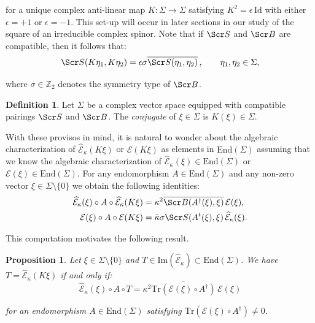 \documentclass[10pt,a4paper,twoside,reqno]{amsart}
\theoremstyle{plain}
\newtheorem{prop}[thm]{Proposition}
\theoremstyle{definition}
\newtheorem{definition}[thm]{Definition}
\theoremstyle{remark}
\newcommand{\End}{\mathrm{End}}
\def\Id{\mathrm{Id}}
\newcommand{\Tr}{\mathrm{Tr}}
\def\scB{\Scr B}
\def\scS{\Scr S}
\def\cE{\mathcal{E}}
\def\hcE{\widehat{\mathcal{E}}}
\def\Im{\mathrm{Im}}
\begin{document}
\noindent
for a unique complex anti-linear map $K\colon \Sigma \to \Sigma$ satisfying $K^2 = \epsilon\, \Id$ with either $\epsilon = +1$ or $\epsilon = -1$. This set-up will occur in later sections in our study of the square of an irreducible complex spinor. Note that if $\scS$ and $\scB$ are compatible, then it follows that:
\begin{equation*}
\scS(K\eta_1 , K\eta_2) = \epsilon \sigma  \overline{\scS(\eta_1 , \eta_2)}\, ,\qquad  \eta_1 , \eta_2 \in \Sigma,
\end{equation*}

\noindent
where $\sigma\in \mathbb{Z}_2$ denotes the symmetry type of $\scB$. 
\begin{definition}
\label{def:conjugatevector}
Let $\Sigma$ be a complex vector space equipped with compatible pairings $\scS$ and $\scB$. The \emph{conjugate} of $\xi \in \Sigma$ is $K(\xi) \in \Sigma$. 
\end{definition}

\noindent
With these provisos in mind, it is natural to wonder about the algebraic characterization of $\hcE_{\kappa}(K\xi)$ or $\cE(K\xi)$ as elements in $\End(\Sigma)$ assuming that we know the algebraic characterization of $\hcE_{\kappa}(\xi) \in \End(\Sigma)$ or $\cE(\xi) \in \End(\Sigma)$. For any endomorphism $A\in \End(\Sigma)$ and any non-zero vector $\xi\in \Sigma \setminus \{ 0 \}$ we obtain the following identities:
\begin{align}
\hcE_{\kappa}(\xi) \circ A\circ \hcE_{\kappa}(K\xi) &=   \kappa^2 \overline{\scB(A^{\dagger}(\xi),\xi)}\, \cE(\xi), \label{eq:conjugatemix1}\\
\cE(\xi) \circ A\circ \cE(K\xi) &= \bar{\kappa} \sigma  \scS( A^t(\xi) , \xi) \, \hcE_\kappa(\xi). \label{eq:conjugatemix2}
\end{align}

\noindent
This computation motivates the following result. 

\begin{prop}
\label{prop:conjugatevectorsquaresesqui}
Let $\xi \in \Sigma\setminus \{ 0\}$ and $T\in \Im(\hcE_{\kappa})\subset \End(\Sigma)$. We have $T = \hcE_{\kappa}(K \xi)$ if and only if:
\begin{equation}
\label{eq:conjugatevectorsquaresesqui}
\hcE_{\kappa}(\xi) \circ A\circ T = \kappa^2 \overline{\Tr(\cE(\xi) \circ A^{\dagger})}\, \cE(\xi)
\end{equation}

\noindent
for an endomorphism $A\in \End(\Sigma)$ satisfying $\Tr(\cE(\xi) \circ A^{\dagger}) \neq 0$.
\end{prop}
\end{document}
